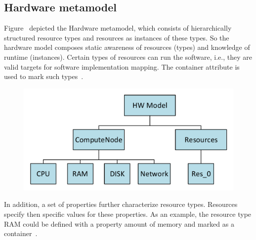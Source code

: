 \subsection{Hardware metamodel}
Figure~\label{fig:HWmodel} depicted the Hardware metamodel, which consists of hierarchically structured resource types and resources as instances of these types. So the hardware model composes static awareness of resources (types) and knowledge of runtime (instances). Certain types of resources can run the software, i.e., they are valid targets for software implementation mapping. The container attribute is used to mark such types~\cite{gotz18}.
\begin{figure}
	\centering
	\includegraphics[width=\textwidth]{images/HWModel}
	\caption{}
	\label{fig:HWmodel}
\end{figure}

In addition, a set of properties further characterize resource types. Resources specify then specific values for these properties. As an example, the resource type RAM could be defined with a property amount of memory and marked as a container~\cite{gotz18}. 

